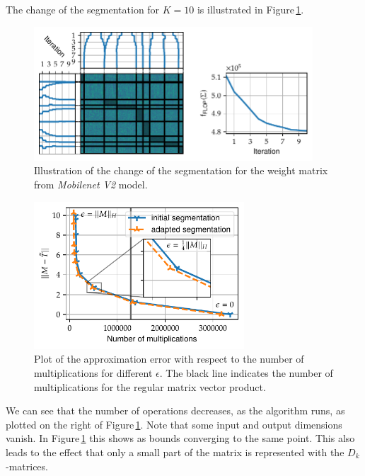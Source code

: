 \documentclass[numbers=noenddot,doctype=mastersthesis,BCOR=15mm,biblatex]{ldvbook}%
\begin{document}
The change of the segmentation for $K=10$ is illustrated in Figure\,\ref{fig:mobilenet_seperation_comp}.
\begin{figure}[!htb]
	\centering
	\includegraphics[width=0.93\textwidth]{Plots/move_example_mobilenet_comp.pdf}
	\caption{Illustration of the change of the segmentation for the weight matrix from \emph{Mobilenet V2} model.
	}
	\label{fig:mobilenet_seperation_comp}
\end{figure}
\begin{figure}[!htb]
	\centering
	\includegraphics[width=0.7\textwidth]{Plots/move_example_mobilenet_error.pdf}
	\caption{Plot of the approximation error with respect to the number of multiplications for different $\epsilon$. 
		The black line indicates the number of multiplications for the regular matrix vector product. 
	}
	\label{fig:mobilenet_err_cost}
\end{figure}
We can see that the number of operations decreases, as the algorithm runs, as plotted on the right of Figure\,\ref{fig:mobilenet_seperation_comp}.
Note that some input and output dimensions vanish. 
In Figure\,\ref{fig:mobilenet_seperation_comp} this shows as bounds converging to the same point. This also leads to the effect that only a small part of the matrix is represented with the $D_k$-matrices.
\end{document}
